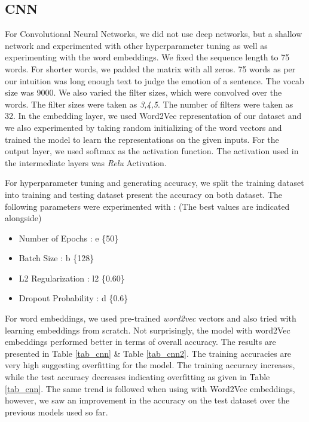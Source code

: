 \documentclass[conference]{IEEEtran}
\numberwithin{equation}{section}
\numberwithin{figure}{section}
\numberwithin{table}{section}
\begin{document}
\subsection{CNN}
For Convolutional Neural Networks, we did not use deep networks, but a shallow network and experimented with other hyperparameter tuning as well as experimenting with the word embeddings. We fixed the sequence length to 75 words. For shorter words, we padded the matrix with all zeros. 75 words as per our intuition was long enough text to judge the emotion of a sentence. The vocab size was 9000. We also varied the filter sizes, which were convolved over the words. The filter sizes were taken as \textit{3,4,5}. The number of filters were taken as 32.  In the embedding layer, we used Word2Vec representation of our dataset and we also experimented by taking random initializing of the word vectors and trained the model to learn the representations on the given inputs. For the output layer, we used softmax as the activation function. The activation used in the intermediate layers was \textit{Relu} Activation.

For hyperparameter tuning and generating accuracy, we split the training dataset into training and testing dataset present the accuracy on both dataset. The following parameters were experimented with : (The best values are indicated alongside)
\begin{itemize}
\item Number of Epochs : e  \{50\}
\item Batch Size : b    \{128\}
\item L2 Regularization : l2  \{0.60\}
\item Dropout Probability : d \{0.6\}
\end{itemize}
For word embeddings, we used pre-trained \textit{word2vec} vectors and also tried with learning embeddings from scratch. Not surprisingly, the model with word2Vec embeddings performed better in terms of overall accuracy. The results are presented in Table \ref{tab_cnn} \& Table \ref{tab_cnn2}. The training accuracies are very high suggesting overfitting for the model. The training accuracy increases, while the test accuracy decreases indicating overfitting as given in Table \ref{tab_cnn}. The same trend is followed when using with Word2Vec embeddings, however, we saw an improvement in the accuracy on the test dataset over the previous models used so far.
\end{document}
